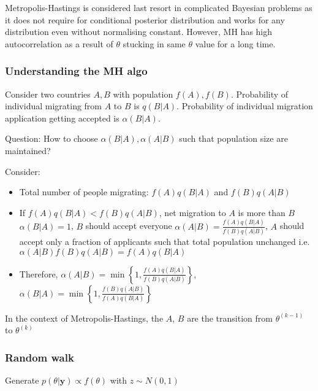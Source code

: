       Metropolis-Hastings is considered last resort in
      complicated Bayesian problems as it does not require
      for conditional posterior distribution and works for
      any distribution even without normalising constant.
      However, MH has high autocorrelation as a result of
      $\theta$ stucking in same $\theta$ value for a long
      time.

      \subsubsection{Understanding the MH algo}

      Consider two countries $A, B$ with population $f(A),
      f(B)$. Probability of individual migrating from $A$ to $B$ is
      $q(B|A)$. Probability of individual migration
      application getting accepted is $\alpha(B|A)$.

      Question: How to choose $\alpha(B|A), \alpha(A|B)$
      such that population size are maintained?

      Consider:
      \begin{itemize}
          \item Total number of people migrating:
              $f(A)q(B|A)$ and $f(B)q(A|B)$
          \item If $f(A)q(B|A) < f(B)q(A|B)$,
              net migration to $A$ is more than $B$
              \subitem $\alpha(B|A)=1$, $B$ should accept
              everyone
              \subitem $\alpha(A|B) = \frac{f(A)q(B|A)}
              {f(B)q(A|B)}$, $A$ should accept only a
              fraction of applicants such that total
              population unchanged i.e.
              $\alpha(A|B)f(B)q(A|B)=f(A)q(B|A)$
          \item Therefore,
              $\alpha(A|B) = \min\left\{
                  1, \frac{f(A)q(B|A)}{f(B)q(A|B)}
              \right\}$,
              $\alpha(B|A) = \min\left\{
                  1, \frac{f(B)q(A|B)}{f(A)q(B|A)}
              \right\}$
      \end{itemize}

      In the context of Metropolis-Hastings, the $A$, $B$
      are the transition from $\theta^{(k-1)}$ to
      $\theta^{(k)}$

      \subsubsection{Random walk}

      Generate $p(\theta|\mathbf{y})\propto f(\theta)$
      with $z\sim N(0, 1)$

